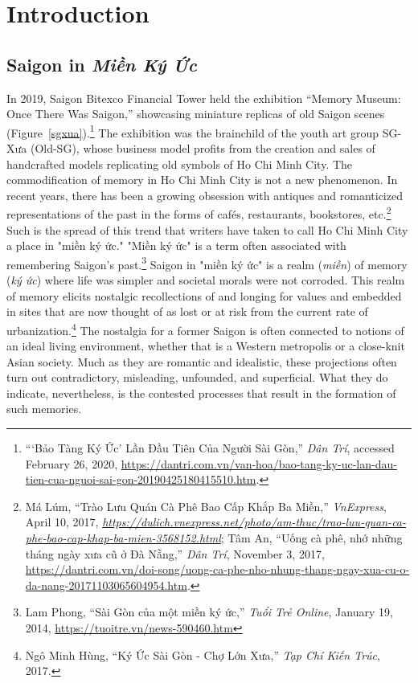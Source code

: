 \chapter{Introduction}\label{intro}
\vi
\section{Saigon in \textit{Miền Ký Ức}}
\vi In 2019, Saigon Bitexco Financial Tower held the exhibition “Memory Museum: Once There Was Saigon,” showcasing miniature replicas of old Saigon scenes (Figure~\ref{sgxua}).\footnote{“‘Bảo Tàng Ký Ức’ Lần Đầu Tiên Của Người Sài Gòn,” \textit{Dân Trí}, accessed February 26, 2020, \url{https://dantri.com.vn/van-hoa/bao-tang-ky-uc-lan-dau-tien-cua-nguoi-sai-gon-20190425180415510.htm}.} The exhibition was the brainchild of the youth art group SG-Xưa (Old-SG), whose business model profits from the creation and sales of handcrafted models replicating old symbols of Ho Chi Minh City. The commodification of memory in Ho Chi Minh City is not a new phenomenon. In recent years, there has been a growing obsession with antiques and romanticized representations of the past in the forms of cafés, restaurants, bookstores, etc.\footnote{Má Lúm, “Trào Lưu Quán Cà Phê Bao Cấp Khắp Ba Miền,” \textit{VnExpress}, April 10, 2017, \textit{\url{https://dulich.vnexpress.net/photo/am-thuc/trao-luu-quan-ca-phe-bao-cap-khap-ba-mien-3568152.html}}; Tâm An, “Uống cà phê, nhớ những tháng ngày xưa cũ ở Đà Nẵng,” \textit{Dân Trí}, November 3, 2017, \url{https://dantri.com.vn/doi-song/uong-ca-phe-nho-nhung-thang-ngay-xua-cu-o-da-nang-20171103065604954.htm}.} Such is the spread of this trend that writers have taken to call Ho Chi Minh City a place in "miền ký ức." "Miền ký ức" is a term often associated with remembering Saigon's past.\footnote{Lam Phong, “Sài Gòn của một miền ký ức,” \textit{Tuổi Trẻ Online}, January 19, 2014, \url{https://tuoitre.vn/news-590460.htm}} Saigon in "miền ký ức" is a realm (\textit{miền}) of memory (\textit{ký ức}) where life was simpler and societal morals were not corroded. This realm of memory elicits nostalgic recollections of and longing for values and embedded in sites that are now thought of as lost or at risk from the current rate of urbanization.\footnote{Ngô Minh Hùng, “Ký Ức Sài Gòn - Chợ Lớn Xưa,” \textit{Tạp Chí Kiến Trúc}, 2017.} The nostalgia for a former Saigon is often connected to notions of an ideal living environment, whether that is a Western metropolis or a close-knit Asian society. Much as they are romantic and idealistic, these projections often turn out contradictory, misleading, unfounded, and superficial. What they do indicate, nevertheless, is the contested processes that result in the formation of such memories. 
\en

